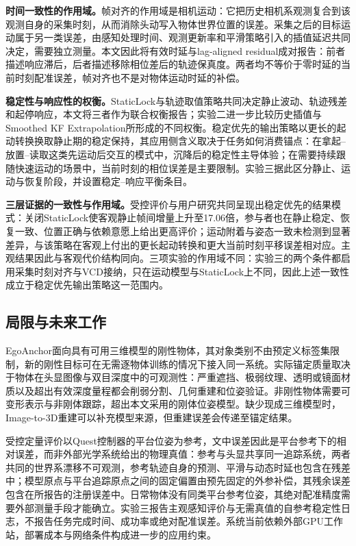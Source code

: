 \documentclass[review]{vgtc}
\begin{document}
\textbf{时间一致性的作用域。}帧对齐的作用域是相机运动：它把历史相机系观测复合到该观测自身的采集时刻，从而消除头动写入物体世界位置的误差。采集之后的目标运动属于另一类误差，由感知处理时间、观测更新率和平滑策略引入的插值延迟共同决定，需要独立测量。本文因此将有效时延与lag-aligned residual成对报告：前者描述响应滞后，后者描述移除相位差后的轨迹保真度。两者均不等价于零时延的当前时刻配准误差，帧对齐也不是对物体运动时延的补偿。

\textbf{稳定性与响应性的权衡。}StaticLock与轨迹取值策略共同决定静止波动、轨迹残差和起停响应，本文将三者作为联合权衡报告；实验二进一步比较历史插值与Smoothed KF Extrapolation所形成的不同权衡。稳定优先的输出策略以更长的起动转换换取静止期的稳定保持，其应用侧含义取决于任务如何消费锚点：在拿起--放置--读取这类先运动后交互的模式中，沉降后的稳定性主导体验；在需要持续跟随快速运动的场景中，当前时刻的相位误差是主要限制。实验三据此区分静止、运动与恢复阶段，并设置稳定--响应平衡条目。

\textbf{三层证据的一致性与作用域。}受控评价与用户研究共同呈现出稳定优先的结果模式：关闭StaticLock使客观静止帧间增量上升至17.06倍，参与者也在静止稳定、恢复一致、位置正确与依赖意愿上给出更高评价；运动附着与姿态一致未检测到显著差异，与该策略在客观上付出的更长起动转换和更大当前时刻平移误差相对应。主观结果因此与客观代价结构同向。三项实验的作用域不同：实验三的两个条件都启用采集时刻对齐与VCD接纳，只在运动模型与StaticLock上不同，因此上述一致性成立于稳定优先输出策略这一范围内。

\subsection{局限与未来工作}

EgoAnchor面向具有可用三维模型的刚性物体，其对象类别不由预定义标签集限制，新的刚性目标可在无需逐物体训练的情况下接入同一系统。实际锚定质量取决于物体在头显图像与双目深度中的可观测性：严重遮挡、极弱纹理、透明或镜面材质以及超出有效深度量程都会削弱分割、几何重建和位姿验证。非刚性物体需要可变形表示与非刚体跟踪，超出本文采用的刚体位姿模型。缺少现成三维模型时，Image-to-3D重建可以补充模型来源，但重建误差会传递至锚定结果。

受控定量评价以Quest控制器的平台位姿为参考，文中误差因此是平台参考下的相对误差，而非外部光学系统给出的物理真值：参考与头显共享同一追踪系统，两者共同的世界系漂移不可观测，参考轨迹自身的预测、平滑与动态时延也包含在残差中；模型原点与平台追踪原点之间的固定偏置由预先固定的外参补偿，其残余误差包含在所报告的注册误差中。日常物体没有同类平台参考位姿，其绝对配准精度需要外部测量手段才能确立。实验三报告主观感知评价与无需真值的自参考稳定性日志，不报告任务完成时间、成功率或绝对配准误差。系统当前依赖外部GPU工作站，部署成本与网络条件构成进一步的应用约束。
\end{document}
